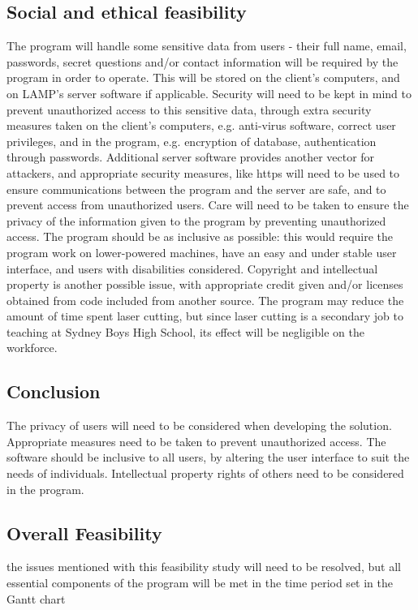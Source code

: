 \documentclass[oneside,openany,11pt,a4paper]{report}
\begin{document}
\subsection{Social and ethical feasibility}
The program will handle some sensitive data from users - their full name, email, passwords, secret questions and/or contact information will be required by the program in order to operate. This will be stored on the client’s computers, and on LAMP’s server software if applicable. Security will need to be kept in mind to prevent unauthorized access to this sensitive data, through extra security measures taken on the client’s computers, e.g. anti-virus software, correct user privileges, and in the program, e.g. encryption of database, authentication through passwords. Additional server software provides another vector for attackers, and appropriate security measures, like https will need to be used to ensure communications between the program and the server are safe, and to prevent access from unauthorized users. Care will need to be taken to ensure the privacy of the information given to the program by preventing unauthorized access. 
The program should be as inclusive as possible: this would require the program work on lower-powered machines, have an easy and under stable user interface, and users with disabilities considered. Copyright and intellectual property is another possible issue, with appropriate credit given and/or licenses obtained from code included from another source. The program may reduce the amount of time spent laser cutting, but since laser cutting is a secondary job to teaching at Sydney Boys High School, its effect will be negligible on the workforce.
\subsection{Conclusion}
The privacy of users will need to be considered when developing the solution. Appropriate measures need to be taken to prevent unauthorized access. The software should be inclusive to all users, by altering the user interface to suit the needs of individuals.  Intellectual property rights of others need to be considered in the program. 

\subsection{Overall Feasibility}
the issues mentioned with this feasibility study will need to be resolved, but all essential components of the program will be met in the time period set in the Gantt chart
\end{document}
